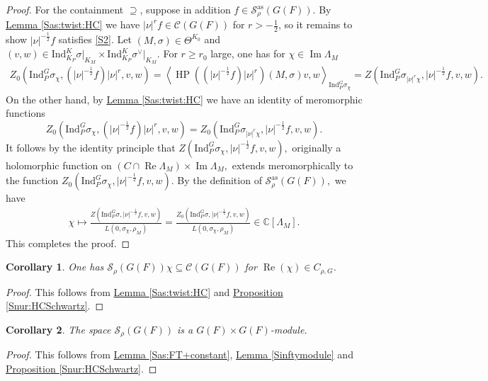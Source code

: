 \documentclass[10pt]{amsart}
\newtheorem{corollary}{Corollary}[theorem]
\theoremstyle{definition}
\numberwithin{equation}{section}
\numberwithin{equation}{subsection}
\newcommand{\Ind}{\mathrm{Ind}}
\newcommand{\CC}{\mathbb{C}}
\renewcommand{\Im}{\mathop{\mathrm{Im}}}
\renewcommand{\Re}{\mathop{\mathrm{Re}}}
\newcommand{\HP}{\mathop{\mathrm{HP}}\nolimits}
\begin{document}
\begin{proof}
For the containment $\supseteq$, suppose in addition $f\in \mathcal{S}_\rho^{\mathrm{as}}(G(F))$. By \hyperref[Sas:twist:HC]{Lemma \ref{Sas:twist:HC}} we have $|\nu|^rf\in\mathcal{C}(G(F))$ for $r>-\frac{1}{2}$, so it remains to show $|\nu|^{-\frac{1}{2}}f$ satisfies \eqref{S2}. Let $(M,\sigma)\in \Theta^{K_0}$ and $(v,w)\in \Ind_{K_P}^K\sigma\vert_{K_M}\times \Ind_{K_P}^K\sigma^\vee\vert_{K_M}.$ For $r\ge r_0$ large, one has for $\chi\in \Im \Lambda_M$  
\begin{align*}
    Z_0(\Ind_P^G\sigma_\chi, (|\nu|^{-\frac{1}{2}}f)|\nu|^r,v,w)=\left\langle\HP((|\nu|^{-\frac{1}{2}}f)|\nu|^r)(M,\sigma) v,w\right\rangle_{\Ind_P^G\sigma_\chi} = Z(\Ind_P^G\sigma_{|\nu|^r\chi},|\nu|^{-\frac{1}{2}}f,v,w).
\end{align*}
On the other hand, by \hyperref[Sas:twist:HC]{Lemma \ref{Sas:twist:HC}} we have an identity of meromorphic functions $$Z_0(\Ind_P^G\sigma_\chi, (|\nu|^{-\frac{1}{2}}f)|\nu|^r,v,w)=Z_0(\Ind_P^G\sigma_{|\nu|^r\chi}, |\nu|^{-\frac{1}{2}}f,v,w).$$
It follows by the identity principle that $ Z(\Ind_P^G\sigma_{\chi},|\nu|^{-\frac{1}{2}}f,v,w),$ originally a holomorphic function on $(C\cap \Re \Lambda_M)\times \Im \Lambda_M,$ extends meromorphically to the function $Z_0(\Ind_P^G\sigma_{\chi},|\nu|^{-\frac{1}{2}}f,v,w)$. By the definition of  $\mathcal{S}_\rho^{\mathrm{as}}(G(F)),$ we have
\begin{align*}
    \chi\longmapsto \frac{Z(\Ind_P^G\sigma, |\nu|^{-\frac{1}{2}}f,v,w)}{L(0,\sigma_{\chi},\rho_M)}=\frac{Z_0(\Ind_P^G\sigma, |\nu|^{-\frac{1}{2}}f,v,w)}{L(0,\sigma_{\chi},\rho_M)}\in \CC[\Lambda_M].
\end{align*}
This completes the proof.
\end{proof}


\begin{corollary}\label{Srho:in:Sas} One has $\mathcal{S}_\rho(G(F))\chi \subseteq \mathcal{C}(G(F))$ for $\Re(\chi)\in C_{\rho,G}$. 
\end{corollary}

\begin{proof} This follows from \hyperref[Sas:twist:HC]{Lemma \ref{Sas:twist:HC}} and \hyperref[Snur:HCSchwartz]{Proposition \ref{Snur:HCSchwartz}}.
\end{proof}


\begin{corollary}\label{Srhomodule}
    The space $\mathcal{S}_\rho(G(F))$ is a $G(F)\times G(F)$-module.
\end{corollary}
\begin{proof}
    This follows from \hyperref[Sas:FT+constant]{Lemma \ref{Sas:FT+constant}}, \hyperref[Sinftymodule]{Lemma \ref{Sinftymodule}} and \hyperref[Snur:HCSchwartz]{Proposition \ref{Snur:HCSchwartz}}.
\end{proof}
\end{document}
